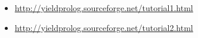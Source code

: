 \secdown

\begin{itemize}[nosep]
  \item 
\url{http://yieldprolog.sourceforge.net/tutorial1.html}
  \item 
\url{http://yieldprolog.sourceforge.net/tutorial2.html}
\end{itemize}

\secdown


\secup
\secup